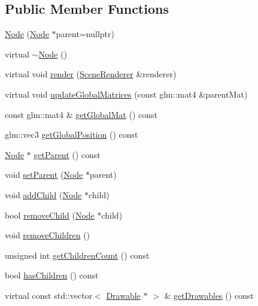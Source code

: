 \subsection*{Public Member Functions}
\begin{DoxyCompactItemize}
\item 
\mbox{\hyperlink{classec_1_1_node_a38582758606734f5f3a0e5c6d3dc0200}{Node}} (\mbox{\hyperlink{classec_1_1_node}{Node}} $\ast$parent=nullptr)
\item 
virtual \mbox{\hyperlink{classec_1_1_node_a6b2dfa6d2490ec46a5d15a326780889b}{$\sim$\+Node}} ()
\item 
virtual void \mbox{\hyperlink{classec_1_1_node_add44dc77d499886e9c75a0e1c1e446cf}{render}} (\mbox{\hyperlink{classec_1_1_scene_renderer}{Scene\+Renderer}} \&renderer)
\item 
virtual void \mbox{\hyperlink{classec_1_1_node_a12a9b14ccc434c52404e262ef5db6f80}{update\+Global\+Matrices}} (const glm\+::mat4 \&parent\+Mat)
\item 
const glm\+::mat4 \& \mbox{\hyperlink{classec_1_1_node_aecf550ed169a643bd9c23979377d8afc}{get\+Global\+Mat}} () const
\item 
glm\+::vec3 \mbox{\hyperlink{classec_1_1_node_ab4072f05f2b51e3d76f67e8557fc2134}{get\+Global\+Position}} () const
\item 
\mbox{\hyperlink{classec_1_1_node}{Node}} $\ast$ \mbox{\hyperlink{classec_1_1_node_ae1f93035b3df9db7a24afc06a7526dab}{get\+Parent}} () const
\item 
void \mbox{\hyperlink{classec_1_1_node_a3c908e5f01e989cedfba5dc1a3ed66c1}{set\+Parent}} (\mbox{\hyperlink{classec_1_1_node}{Node}} $\ast$parent)
\item 
void \mbox{\hyperlink{classec_1_1_node_a647bcdef4e01de3ecb34e0917ba9e333}{add\+Child}} (\mbox{\hyperlink{classec_1_1_node}{Node}} $\ast$child)
\item 
bool \mbox{\hyperlink{classec_1_1_node_ab0d856da4064db916e6fd4f9ad1ecafb}{remove\+Child}} (\mbox{\hyperlink{classec_1_1_node}{Node}} $\ast$child)
\item 
void \mbox{\hyperlink{classec_1_1_node_a4d9f13d7482fe4612ec2cffa8a06cc00}{remove\+Children}} ()
\item 
unsigned int \mbox{\hyperlink{classec_1_1_node_a3fb0342e532d42984870f598ec4d0ba3}{get\+Children\+Count}} () const
\item 
bool \mbox{\hyperlink{classec_1_1_node_ae1626b695c7c5f15af399772b51d0a5a}{has\+Children}} () const
\item 
virtual const std\+::vector$<$ \mbox{\hyperlink{classec_1_1_drawable}{Drawable}} $\ast$ $>$ \& \mbox{\hyperlink{classec_1_1_node_a2403cd39000eceffdec878133f621e3a}{get\+Drawables}} () const

\end{DoxyCompactItemize}
